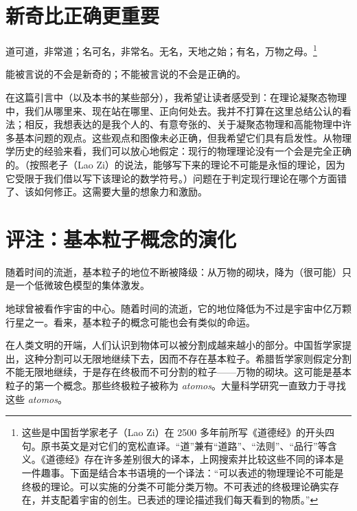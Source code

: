 \section{新奇比正确更重要}

\begin{keypoints}
\item 道可道，非常道；名可名，非常名。无名，天地之始；有名，万物之母。\footnote{这些是中国哲学家老子（Lao Zi）在 2500 多年前所写《道德经》的开头四句。原书英文是对它们的宽松直译。“道”兼有“道路”、“法则”、“品行”等含义。《道德经》存在许多差别很大的译本，上网搜索并比较这些不同的译本是一件趣事。下面是结合本书语境的一个译法：“可以表述的物理理论不可能是终极的理论。可以实施的分类不可能分类万物。不可表述的终极理论确实存在，并支配着宇宙的创生。已表述的理论描述我们每天看到的物质。”}
\item 能被言说的不会是新奇的；不能被言说的不会是正确的。
\end{keypoints}

在这篇引言中（以及本书的某些部分），我希望让读者感受到：在理论凝聚态物理中，我们从哪里来、现在站在哪里、正向何处去。我并不打算在这里总结公认的看法；相反，我想表达的是我个人的、有意夸张的、关于凝聚态物理和高能物理中许多基本问题的观点。这些观点和图像未必正确，但我希望它们具有启发性。从物理学历史的经验来看，我们可以放心地假定：现行的物理理论没有一个会是完全正确的。（按照老子（Lao Zi）的说法，能够写下来的理论不可能是永恒的理论，因为它受限于我们借以写下该理论的数学符号。）问题在于判定现行理论在哪个方面错了、该如何修正。这需要大量的想象力和激励。

\section{评注：基本粒子概念的演化}

\begin{keypoints}
\item 随着时间的流逝，基本粒子的地位不断被降级：从万物的砌块，降为（很可能）只是一个低微玻色模型的集体激发。
\end{keypoints}

地球曾被看作宇宙的中心。随着时间的流逝，它的地位降低为不过是宇宙中亿万颗行星之一。看来，基本粒子的概念可能也会有类似的命运。

在人类文明的开端，人们认识到物体可以被分割成越来越小的部分。中国哲学家提出，这种分割可以无限地继续下去，因而不存在基本粒子。希腊哲学家则假定分割不能无限地继续，于是存在终极而不可分割的粒子——万物的砌块。这可能是基本粒子的第一个概念。那些终极粒子被称为 \emph{atomos}。大量科学研究一直致力于寻找这些 \emph{atomos}。

